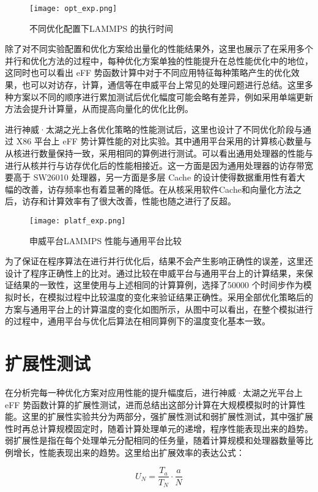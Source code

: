  \begin{figure}[h]
  \centering
  \texttt{[image: opt\_exp.png]}
  \caption{不同优化配置下LAMMPS 的执行时间}
 \end{figure}
 
除了对不同实验配置和优化方案给出量化的性能结果外，这里也展示了在采用多个并行和优化方法的过程中，每种优化方案单独的性能提升在总性能优化中的地位，这同时也可以看出 eFF 势函数计算中对于不同应用特征每种策略产生的优化效果，也可以对访存，计算，通信等在申威平台上常见的处理问题进行总结。这里多种方案以不同的顺序进行累加测试后优化幅度可能会略有差异，例如采用单端更新方法会提升计算量，从而提高向量化的优化比例。

进行神威·太湖之光上各优化策略的性能测试后，这里也设计了不同优化阶段与通过 X86 平台上 eFF 势计算性能的对比实验。其中通用平台采用的计算核心数量与从核进行数量保持一致，采用相同的算例进行测试。可以看出通用处理器的性能与进行从核并行与访存优化后的性能相接近。这一方面是因为通用处理器的访存带宽要高于 SW26010 处理器，另一方面是多层 Cache 的设计使得数据重用性有着大幅的改善，访存频率也有着显著的降低。在从核采用软件Cache和向量化方法之后，访存和计算效率有了很大改善，性能也随之进行了反超。

 \begin{figure}[h]
  \centering
  \texttt{[image: platf\_exp.png]}
  \caption{申威平台LAMMPS 性能与通用平台比较}
\end{figure}

为了保证在程序算法在进行并行优化后，结果不会产生影响正确性的误差，这里还设计了程序正确性上的比对。通过比较在申威平台与通用平台上的计算结果，来保证结果的一致性，这里使用与上述相同的计算算例，选择了50000 个时间步作为模拟时长，在模拟过程中比较温度的变化来验证结果正确性。采用全部优化策略后的方案与通用平台上的计算温度的变化如图所示，从图中可以看出，在整个模拟进行的过程中，通用平台与优化后算法在相同算例下的温度变化基本一致。

\section{扩展性测试}
在分析完每一种优化方案对应用性能的提升幅度后，进行神威·太湖之光平台上 eFF 势函数计算的扩展性测试，进而总结出这部分计算在大规模模拟时的计算性能。这里的扩展性实验共分为两部分，强扩展性测试和弱扩展性测试，其中强扩展性时再总计算规模固定时，随着计算处理单元的递增，程序性能表现出来的趋势。弱扩展性是指在每个处理单元分配相同的任务量，随着计算规模和处理器数量等比例增长，性能表现出来的趋势。这里给出扩展效率的表达公式：

\begin{equation}
  U_N=\frac{T_a}{T_N}\cdot \frac{a}{N}
\end{equation}

